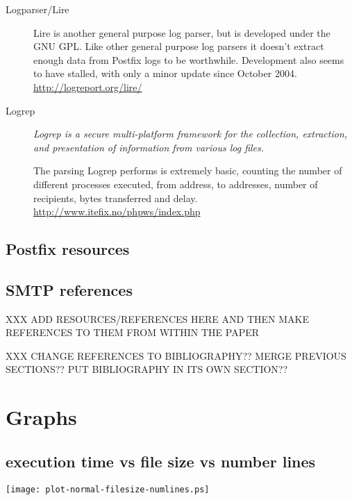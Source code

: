\documentclass[a4paper,12pt,draft]{article}
\begin{document}
\begin{description}
    \item [Logparser/Lire] Lire is another general purpose log parser, but
        is developed under the GNU GPL\@.  Like other general purpose log
        parsers it doesn't extract enough data from Postfix logs to be
        worthwhile.  Development also seems to have stalled, with only a
        minor update since October 2004.  \newline
        \url{http://logreport.org/lire/}

    \item [Logrep] \textit{Logrep is a secure multi-platform framework for
        the collection, extraction, and presentation of information from
        various log files.\/}

        The parsing Logrep performs is extremely basic, counting the number
        of different processes executed, from address, to addresses, number
        of recipients, bytes transferred and delay.  \newline
        \url{http://www.itefix.no/phpws/index.php}

\end{description}

\subsection{Postfix resources}

\subsection{SMTP references}

XXX ADD RESOURCES/REFERENCES HERE AND THEN MAKE REFERENCES TO THEM FROM WITHIN THE PAPER

XXX CHANGE REFERENCES TO BIBLIOGRAPHY??  MERGE PREVIOUS SECTIONS??  PUT
BIBLIOGRAPHY IN ITS OWN SECTION??




\section{Graphs}

\subsection{execution time vs file size vs number lines}
\label{execution time vs file size vs number lines}
\texttt{[image: plot-normal-filesize-numlines.ps]}
\end{document}
